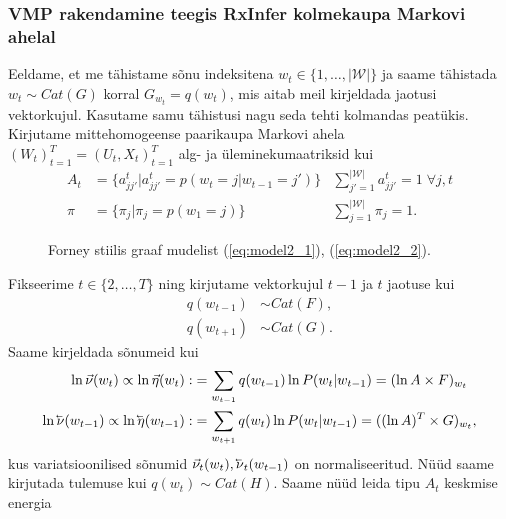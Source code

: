\subsubsection{VMP rakendamine teegis RxInfer kolmekaupa Markovi ahelal} 

Eeldame, et me tähistame sõnu indeksitena $w_t \in \{1,\ldots,|\mathcal{W}|\}$ ja saame tähistada $w_t \sim Cat(G)$ korral $G_{w_t} = q(w_t)$, mis aitab meil kirjeldada jaotusi vektorkujul. Kasutame samu tähistusi nagu seda tehti \cite{Beal2003VariationalAF}{ kolmandas peatükis}. Kirjutame mittehomogeense paarikaupa Markovi ahela $(W_t)_{t=1}^T = (U_t, X_t)_{t=1}^T$ alg- ja üleminekumaatriksid kui
\begin{align*}
   A_t &= \{a^t_{jj'} | a^t_{jj'} = p(w_t = j | w_{t-1} = j')\} &\sum_{j'=1}^{|\mathcal{W}|} a^t_{jj'} = 1 \; \forall j, t\\
    \pi &= \{ \pi_j | \pi_j = p(w_1 = j) \} &\sum_{j=1}^{|\mathcal{W}|} \pi_{j} = 1.
\end{align*}

\begin{figure}[!ht]
\centering
{}%
\caption{Forney stiilis graaf mudelist (\ref{eq:model2_1}), (\ref{eq:model2_2}).}
\label{fig:tmm_model2}
\end{figure}

Fikseerime $t \in \{2,\ldots,T\}$ ning kirjutame vektorkujul $t-1$ ja $t$ jaotuse kui
\begin{align*}
    q(w_{t-1}) &\sim Cat(F),\\
    q(w_{t+1}) &\sim Cat(G).
\end{align*}
Saame kirjeldada sõnumeid kui 
\begin{align*}
    \ln \vec{\nu}(w_t) \propto \ln \vec{\eta}(w_t) :&= \sum_{w_{t-1}} q(w_{t-1}) \ln P(w_t | w_{t-1}) = (\ln A \times F)_{w_t} \\
    \ln \cev{\nu}(w_{t-1}) \propto \ln \cev{\eta}(w_{t-1}) :&= \sum_{w_{t+1}} q(w_{t}) \ln P(w_{t} | w_{t-1}) = ((\ln A)^T \times G)_{w_{t}},
\end{align*}
kus variatsioonilised sõnumid $\vec{\nu}_{t}(w_t), \cev{\nu}_{t}(w_{t-1})$ on normaliseeritud. Nüüd saame kirjutada tulemuse kui $q(w_t) \sim Cat(H)$. Saame nüüd leida tipu $A_t$ keskmise energia

